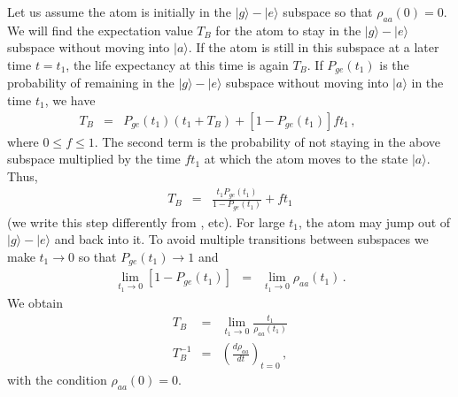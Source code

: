 \documentclass[twocolumn,aps,eqsecnum,showkeys,amsmath]{revtex4-2}
\begin{document}
Let us assume the atom is initially in the $| g \rangle - | e \rangle$ subspace 
so that $\rho_{aa}(0)=0$. We will find the expectation value $T_B$ for the 
atom to stay in the $| g \rangle - | e \rangle$ subspace without moving into 
$| a \rangle$. If the atom is still in this subspace at a later time $t=t_1$, the 
life expectancy at this time is again $T_B$. If $P_{ge}(t_1)$ is the probability 
of remaining in the $| g \rangle - | e \rangle$ subspace without moving into 
$| a \rangle$ in the time $t_1$, we have  
%
\begin{eqnarray}
T_B &=& P_{ge}(t_1) (t_1+ T_B) +[1- P_{ge}(t_1)] f t_1 \,, \qquad
\end{eqnarray}
where $0 \leq f \leq 1$. The second term is the probability of not staying 
in the above subspace multiplied by the time $f t_1$ at which the atom 
moves to the state $| a \rangle$. Thus, 
%
\begin{eqnarray}
T_B &=& \frac{t_1 P_{ge}(t_1)}{ 1- P_{ge}(t_1) } +f t_1  
\end{eqnarray}
(we write this step differently from \cite{PeKn88a,PeKn88b,EvKe02}, etc). 
For large $t_1$, the atom may jump out of $| g \rangle - | e \rangle$ and 
back into it. To avoid multiple transitions between subspaces we make 
$t_1 \to 0$ so that $P_{ge} (t_1) \to 1$ and 
%
\begin{eqnarray}
\lim_{t_1 \to 0} [1- P_{ge} (t_1)] &=& \lim_{t_1 \to 0} \rho_{aa} (t_1) \,.
\end{eqnarray}
We obtain 
%
\begin{eqnarray}
T_B &=& \lim_{t_1 \to 0} \frac{t_1}{\rho_{aa} (t_1)}  	\\ 
T_B^{-1} &=& \left( \frac{ d \rho_{aa} }{dt} \right)_{t=0} \,,
\end{eqnarray}
with the condition $\rho_{aa}(0) =0$. 
\end{document}

